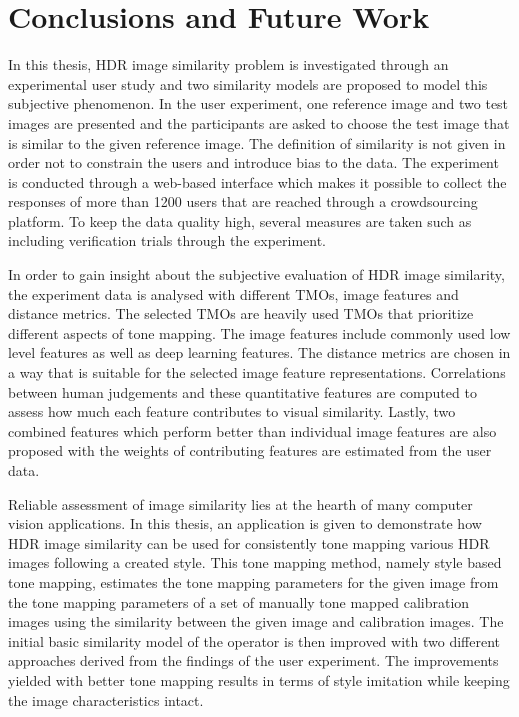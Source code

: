 \chapter{Conclusions and Future Work}
\label{chp:b7}

In this thesis, HDR image similarity problem is investigated through an experimental user study and two similarity models are proposed to model this subjective phenomenon. In the user experiment, one reference image and two test images are presented and the participants are asked to choose the test image that is similar to the given reference image. The definition of similarity is not given in order not to constrain the users and introduce bias to the data. The experiment is conducted through a web-based interface which makes it possible to collect the responses of more than 1200 users that are reached through a crowdsourcing platform. To keep the data quality high, several measures are taken such as including verification trials through the experiment.

In order to gain insight about the subjective evaluation of HDR image similarity, the experiment data is analysed with different TMOs, image features and distance metrics. The selected TMOs are heavily used TMOs that prioritize different aspects of tone mapping. The image features include commonly used low level features as well as deep learning features. The distance metrics are chosen in a way that is suitable for the selected image feature representations. Correlations between human judgements and these quantitative features are computed to assess how much each feature contributes to visual similarity. Lastly, two combined features which perform better than individual image features are also proposed with the weights of contributing features are estimated from the user data. 

Reliable assessment of image similarity lies at the hearth of many computer vision applications. In this thesis, an application is given to demonstrate how HDR image similarity can be used for consistently tone mapping various HDR images following a created style. This tone mapping method, namely style based tone mapping, estimates the tone mapping parameters for the given image from the tone mapping parameters of a set of manually tone mapped calibration images using the similarity between the given image and calibration images. The initial basic similarity model of the operator is then improved with two different approaches derived from the findings of the user experiment. The improvements yielded with better tone mapping results in terms of style imitation while keeping the image characteristics intact. 

